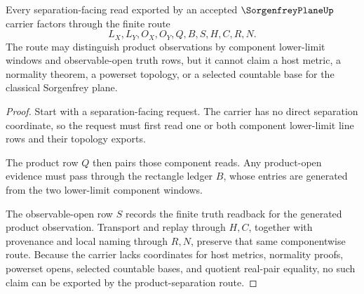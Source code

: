 \begin{theorem}
\label{thm:sorgenfrey-plane-product-separation-route}
Every separation-facing read exported by an accepted $\SorgenfreyPlaneUp$ carrier factors through the finite route
$$
L_X,L_Y,O_X,O_Y,Q,B,S,H,C,R,N.
$$
The route may distinguish product observations by component lower-limit windows and observable-open truth rows, but it cannot claim a host metric, a normality theorem, a powerset topology, or a selected countable base for the classical Sorgenfrey plane.
\end{theorem}
\begin{proof}
Start with a separation-facing request. The carrier has no direct separation coordinate, so the request must first read one or both component lower-limit line rows and their topology exports.

The product row $Q$ then pairs those component reads. Any product-open evidence must pass through the rectangle ledger $B$, whose entries are generated from the two lower-limit component windows.

The observable-open row $S$ records the finite truth readback for the generated product observation. Transport and replay through $H,C$, together with provenance and local naming through $R,N$, preserve that same componentwise route. Because the carrier lacks coordinates for host metrics, normality proofs, powerset opens, selected countable bases, and quotient real-pair equality, no such claim can be exported by the product-separation route.
\end{proof}


